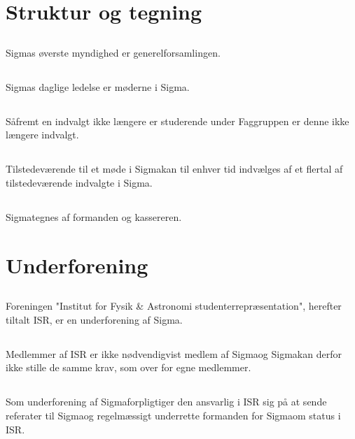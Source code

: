 \documentclass[danish,a4paper,twocolumn]{article}
\newcommand{\foreningen}{Sigma}
\begin{document}
\section{Struktur og tegning}
\subsection{}\foreningen s øverste myndighed er generelforsamlingen.
\subsection{}\foreningen s daglige ledelse er møderne i \foreningen.
\subsection{}Såfremt en indvalgt ikke længere er studerende under Faggruppen er denne ikke længere indvalgt.
\subsection{}Tilstedeværende til et møde i \foreningen kan til enhver tid indvælges af et flertal af tilstedeværende indvalgte i \foreningen.
\subsection{}\foreningen tegnes af formanden og kassereren.

\section{Underforening}
\subsection{}Foreningen "Institut for Fysik \& Astronomi studenterrepræsentation", herefter tiltalt ISR, er en underforening af \foreningen.
\subsection{}Medlemmer af ISR er ikke nødvendigvist medlem af \foreningen og \foreningen kan derfor ikke stille de samme krav, som over for egne medlemmer.
\subsection{}Som underforening af \foreningen forpligtiger den ansvarlig i ISR sig på at sende referater til \foreningen og regelmæssigt underrette formanden for \foreningen om status i ISR.
\end{document}
